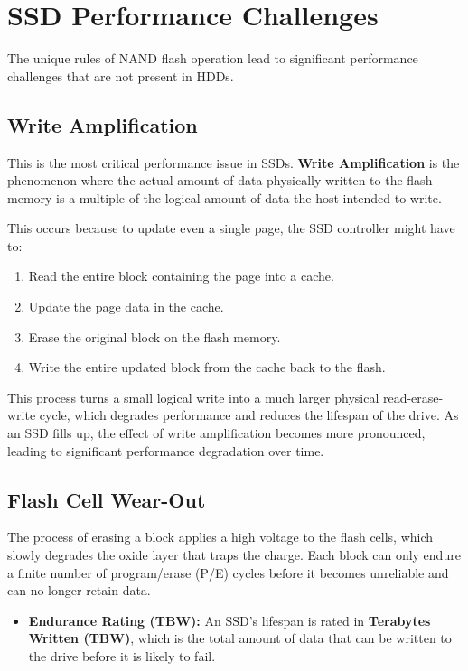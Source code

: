 \section{SSD Performance Challenges}
The unique rules of NAND flash operation lead to significant performance challenges that are not present in HDDs.

\subsection{Write Amplification}
This is the most critical performance issue in SSDs. \textbf{Write Amplification} is the phenomenon where the actual amount of data physically written to the flash memory is a multiple of the logical amount of data the host intended to write.

This occurs because to update even a single page, the SSD controller might have to:
\begin{enumerate}
    \item Read the entire block containing the page into a cache.
    \item Update the page data in the cache.
    \item Erase the original block on the flash memory.
    \item Write the entire updated block from the cache back to the flash.
\end{enumerate}
This process turns a small logical write into a much larger physical read-erase-write cycle, which degrades performance and reduces the lifespan of the drive. As an SSD fills up, the effect of write amplification becomes more pronounced, leading to significant performance degradation over time.

\subsection{Flash Cell Wear-Out}
The process of erasing a block applies a high voltage to the flash cells, which slowly degrades the oxide layer that traps the charge. Each block can only endure a finite number of program/erase (P/E) cycles before it becomes unreliable and can no longer retain data.
\begin{itemize}
    \item \textbf{Endurance Rating (TBW):} An SSD's lifespan is rated in \textbf{Terabytes Written (TBW)}, which is the total amount of data that can be written to the drive before it is likely to fail.
\end{itemize}

